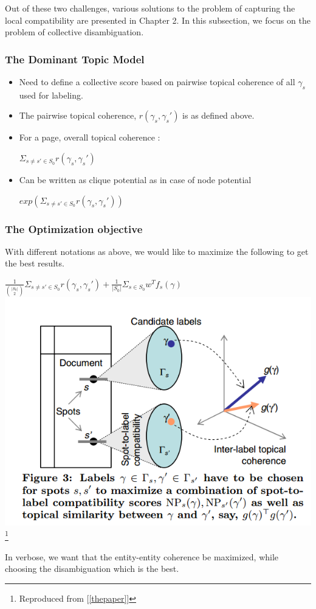  Out of these two challenges, various solutions to the problem of capturing the local compatibility are presented in Chapter 2. 
 In this subsection, we focus on the problem of collective disambiguation. 
 
 \subsubsection{The Dominant Topic Model}
  \begin{itemize}
   \item Need to define a collective score based on pairwise topical coherence of all $\gamma_s$ used for labeling. \medskip
   \item The pairwise topical coherence, $r(\gamma_s, \gamma_s')$ is as defined above.\medskip
   \item For a page, overall topical coherence : \begin{center}\medskip
                                                  $\Sigma_{s \neq s' \in S_0}r(\gamma_s, \gamma_s')$
                                                 \end{center}
   \item Can be written as clique potential as in case of node potential\medskip
      \begin{center}
	$exp(\Sigma_{s \neq s' \in S_0}r(\gamma_s, \gamma_s'))$
      \end{center}

  \end{itemize}

  \subsubsection{The Optimization objective}
  With different notations as above, we would like to maximize the following to get the 
  best results.
 \begin{center}
 $\frac{1}{\binom{|S_0|}{2}}\Sigma_{s \neq s' \in S_0}r(\gamma_s, \gamma_s') + \frac{1}{|S_0|}\Sigma_{s \in S_0}w^{T}f_s(\gamma)$
  \\
  \includegraphics[height = 5 cm, scale = 0.3]{objective}\footnote{Reproduced from [\ref{thepaper}]}
  \end{center}
  In verbose, we want that the entity-entity coherence be maximized, while choosing the disambiguation which is the best.

